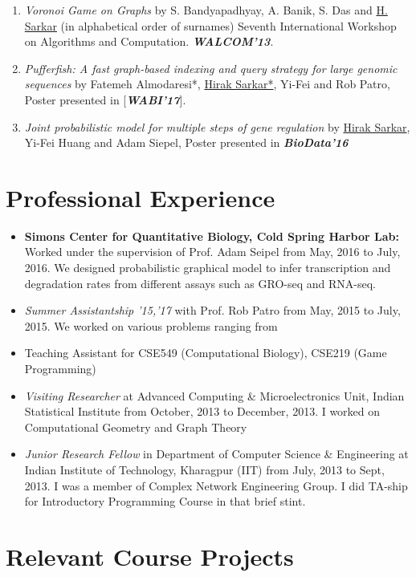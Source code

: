 \documentclass{res}
\begin{document}
\begin{resume}
\begin{enumerate}
\item {\it Voronoi Game on Graphs} by  S. Bandyapadhyay, A. Banik, S. Das and \underline{H. Sarkar} (in alphabetical order of surnames) Seventh International Workshop on Algorithms and Computation. \textit{\textbf{WALCOM'13}}.

\item {\it Pufferfish: A fast graph-based indexing and query strategy for large genomic sequences} by Fatemeh Almodaresi*, \underline{Hirak Sarkar*}, Yi-Fei and Rob Patro, Poster presented in [\textit{\textbf{WABI'17}}].

\item {\it Joint probabilistic model for multiple steps of gene regulation} by \underline{Hirak Sarkar}, Yi-Fei Huang and Adam Siepel, Poster presented in  \textit{\textbf{BioData'16}}

\vspace{-0.5cm}
\end{enumerate}
\section{Professional Experience}
\begin{itemize}
\item {\textbf {Simons Center for Quantitative Biology, Cold Spring Harbor Lab:}} Worked under the supervision of Prof. Adam Seipel from May, 2016 to July, 2016. We designed probabilistic graphical model to infer transcription and degradation rates from different assays such as GRO-seq and RNA-seq.  

\item {\it Summer Assistantship '15,'17} with Prof. Rob Patro from May, 2015 to July, 2015. We worked on various problems ranging from 
\item  Teaching Assistant for CSE549 (Computational Biology), CSE219 (Game Programming)
\item {\it Visiting Researcher} at Advanced Computing \& Microelectronics Unit, Indian Statistical Institute from October, 2013 to December, 
2013. I worked on Computational Geometry and Graph Theory
\item {\it Junior Research Fellow} in Department of Computer Science \& Engineering at Indian Institute of Technology, Kharagpur (IIT) 
from July, 2013 to Sept, 2013. I was a member of Complex Network Engineering Group. I did TA-ship for Introductory Programming 
Course in that brief stint. 
\end{itemize}

\section{Relevant Course Projects}
\begin{itemize}


\end{itemize}
\end{resume}
\end{document}
